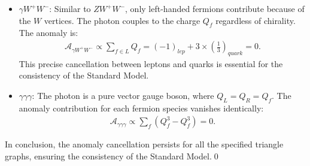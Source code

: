 \begin{itemize}
    \item {$\gamma W^+W^-$}: 
    Similar to $ZW^+W^-$, only left-handed fermions contribute because of the $W$ vertices. The photon couples to the charge $Q_f$ regardless of chirality. The anomaly is:
    \begin{align}
        \mathcal{A}_{\gamma W^+W^-} \propto \sum_{f \in L} Q_f = (-1)_{lep} + 3 \times \left( \frac{1}{3} \right)_{quark} = 0.
    \end{align}
    This precise cancellation between leptons and quarks is essential for the consistency of the Standard Model.

    \item {$\gamma\gamma\gamma$}: 
    The photon is a pure vector gauge boson, where $Q_L = Q_R = Q_f$. The anomaly contribution for each fermion species vanishes identically:
    \begin{align}
        \mathcal{A}_{\gamma\gamma\gamma} \propto \sum_f (Q_f^3 - Q_f^3) = 0.
    \end{align}
\end{itemize}

In conclusion, the anomaly cancellation persists for all the specified triangle graphs, ensuring the consistency of the Standard Model.\qed